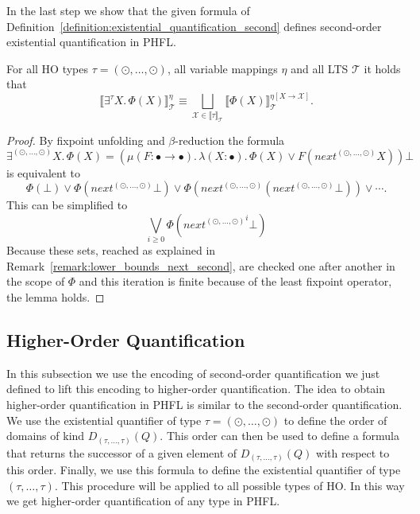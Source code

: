 In the last step we show that the given formula of Definition~\ref{definition:existential_quantification_second} defines
second-order existential quantification in PHFL.

\begin{lemma}
    \label{lemma:existential_quantifier_second}
    For all HO types $\tau = (\odot, \dots, \odot)$, all variable mappings $\eta$ and all LTS $\mathcal{T}$ it holds that
    \[\llbracket \exists^\tau X.\,\Phi(X)\rrbracket^\eta_\mathcal{T} \equiv \underset{\mathcal{X} \in \llbracket \tau
    \rrbracket_\mathcal{T}}{\bigsqcup} \llbracket \Phi(X) \rrbracket^{\eta[X\rightarrow \mathcal{X}]}_\mathcal{T}.\]
\end{lemma}

\begin{proof}
    By fixpoint unfolding and $\beta$-reduction the formula 
    \[\exists^{(\odot, \dots, \odot)}X.\, \Phi(X) = (\mu (F \colon \bullet \rightarrow \bullet).\, \lambda (X
    \colon \bullet).\, \Phi(X) \vee F(next^{(\odot, \dots, \odot)} X)) \bot\] is equivalent to 
    \[\Phi(\bot) \vee \Phi(next^{(\odot, \dots, \odot)}\bot) \vee \Phi(next^{(\odot, \dots, \odot)} (next^{(\odot, \dots, \odot)} \bot)) \vee \dotsb. \]
    This can be simplified to
    \[\underset{i\geq0}{\bigvee} \Phi({next^{(\odot, \dots, \odot)}}^i \bot)\]
	Because these sets, reached as explained in Remark~\ref{remark:lower_bounds_next_second}, are checked one after another in the scope of $\Phi$ and this iteration is finite 
	because of the least fixpoint operator, the lemma holds.
\end{proof}

\subsection{Higher-Order Quantification}\label{subsec:higher-orderQuantification}

In this subsection we use the encoding of second-order quantification  we just defined to lift this encoding to higher-order
quantification. The idea to obtain higher-order quantification in PHFL is similar to the second-order quantification.
We use the existential quantifier of type $\tau = (\odot, \dots, \odot)$ to define the order of domains of kind
$D_{(\tau, \dots, \tau)}(Q)$. This order can then be used to define a formula that returns the successor
of a given element of $D_{(\tau, \dots, \tau)}(Q)$ with respect to this order. Finally, we use this
formula to define the existential quantifier of type $(\tau, \dots, \tau)$. This procedure will be applied to all
possible types of HO. In this way we get higher-order quantification of any type in PHFL.

